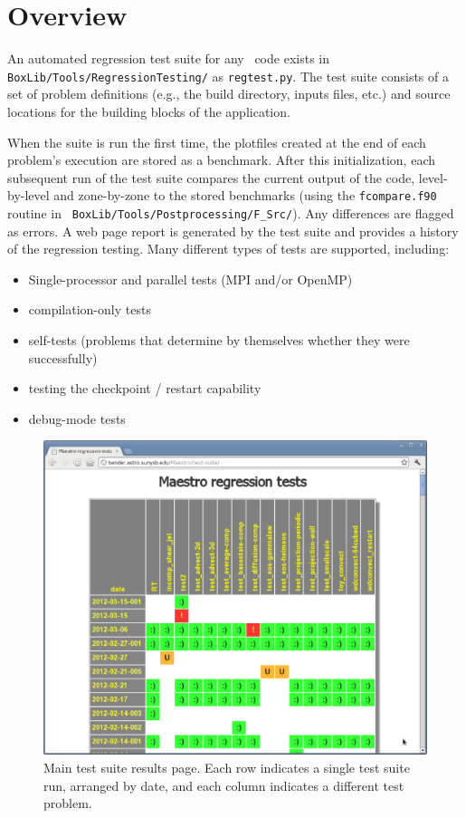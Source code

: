 \section{Overview}

An automated regression test suite for any \boxlib\ code
exists in {\tt BoxLib/Tools/RegressionTesting/} as {\tt regtest.py}.
The test suite consists of a set of problem definitions (e.g., the
build directory, inputs files, etc.) and source locations for the
building blocks of the application.

When the suite is run the first time, the plotfiles created at the end
of each problem's execution are stored as a benchmark.  After this
initialization, each subsequent run of the test suite compares the
current output of the code, level-by-level and zone-by-zone to the
stored benchmarks (using the {\tt fcompare.f90} routine in {\tt
  BoxLib/Tools/Postprocessing/F\_Src/}).  Any differences are flagged as errors.
A web page report is generated by the test suite and provides a
history of the regression testing.  Many different types of tests
are supported, including:
\begin{itemize}
\item Single-processor and parallel tests (MPI and/or OpenMP)
\item compilation-only tests
\item self-tests (problems that determine by themselves whether they were successfully)
\item testing the checkpoint / restart capability
\item debug-mode tests
\end{itemize}

\begin{figure}[t]
\centering
\includegraphics[width=5.0in]{testsuite}
\caption{\label{fig:test_suite_main} Main test suite results page.  Each
row indicates a single test suite run, arranged by date, and each column
indicates a different test problem. }
\end{figure}

